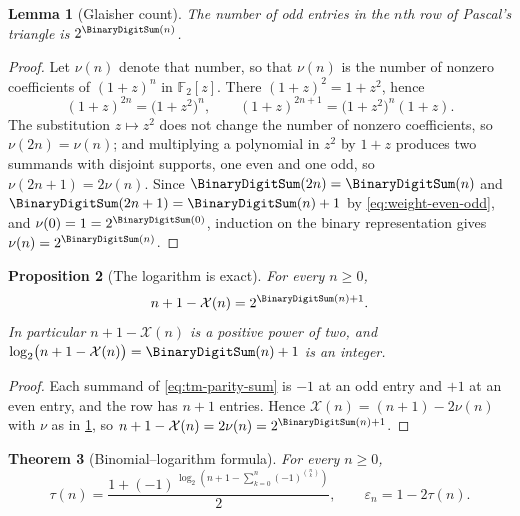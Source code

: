 \documentclass[11pt,oneside]{article}
\newtheorem{theorem}{Theorem}[section]
\newtheorem{proposition}[theorem]{Proposition}
\newtheorem{lemma}[theorem]{Lemma}
\theoremstyle{definition}
\theoremstyle{remark}
\begin{document}
\begin{lemma}[Glaisher count]
\label{thm:tm-glaisher}
The number of odd entries in the $n$\/th row of Pascal's triangle is $2^{\BinaryDigitSum(n)}$.
\end{lemma}

\begin{proof}
Let $\nu(n)$ denote that number, so that $\nu(n)$ is the number of nonzero coefficients of
$(1+z)^n$ in $\mathbb F_2[z]$.  There $(1+z)^2=1+z^2$, hence
\begin{equation*}
 (1+z)^{2n}=\bigl(1+z^2\bigr)^n,
 \qquad
 (1+z)^{2n+1}=\bigl(1+z^2\bigr)^n(1+z).
\end{equation*}
The substitution $z\mapsto z^2$ does not change the number of nonzero coefficients, so
$\nu(2n)=\nu(n)$; and multiplying a polynomial in $z^2$ by $1+z$ produces two summands with
disjoint supports, one even and one odd, so $\nu(2n+1)=2\nu(n)$.  Since $\BinaryDigitSum(2n)=\BinaryDigitSum(n)$
and $\BinaryDigitSum(2n+1)=\BinaryDigitSum(n)+1$ by \eqref{eq:weight-even-odd}, and $\nu(0)=1=2^{\BinaryDigitSum(0)}$,
induction on the binary representation gives $\nu(n)=2^{\BinaryDigitSum(n)}$.
\end{proof}

\begin{proposition}[The logarithm is exact]
\label{thm:tm-log-exact}
For every $n\ge0$,
\begin{equation}
 n+1-\mathcal X(n)=2^{\BinaryDigitSum(n)+1}.                           \label{eq:tm-log-exact}
\end{equation}
In particular $n+1-\mathcal X(n)$ is a positive power of two, and
$\log_2\bigl(n+1-\mathcal X(n)\bigr)=\BinaryDigitSum(n)+1$ is an integer.
\end{proposition}

\begin{proof}
Each summand of \eqref{eq:tm-parity-sum} is $-1$ at an odd entry and $+1$ at an even entry,
and the row has $n+1$ entries.  Hence $\mathcal X(n)=(n+1)-2\nu(n)$ with $\nu$ as in
\cref{thm:tm-glaisher}, so $n+1-\mathcal X(n)=2\nu(n)=2^{\BinaryDigitSum(n)+1}$.
\end{proof}

\begin{theorem}[Binomial--logarithm formula]
\label{thm:tm-bit-formula}
For every $n\ge0$,
\begin{equation}
 \tau(n)=\frac{1+(-1)^{\,\log_2\!\left(n+1-\sum_{k=0}^{n}(-1)^{\binom nk}\right)}}{2},
 \qquad
 \varepsilon_n=1-2\tau(n).                                 \label{eq:tm-bit-formula}
\end{equation}
\end{theorem}
\end{document}
